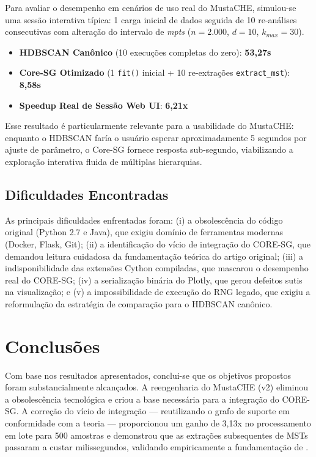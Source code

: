 \documentclass[12pt,a4paper,oneside]{article}
\newcommand{\textcite}{\citet}
\begin{document}
Para avaliar o desempenho em cenários de uso real do MustaCHE, simulou-se uma sessão
interativa típica: 1 carga inicial de dados seguida de 10 re-análises consecutivas com
alteração do intervalo de \textit{mpts} ($n=2.000$, $d=10$, $k_{max}=30$).

\begin{itemize}
  \item \textbf{HDBSCAN Canônico} (10 execuções completas do zero): \textbf{53,27s}
  \item \textbf{Core-SG Otimizado} (1 \texttt{fit()} inicial + 10 re-extrações
        \texttt{extract\_mst}): \textbf{8,58s}
  \item \textbf{Speedup Real de Sessão Web UI}: \textbf{6,21x}
\end{itemize}

Esse resultado é particularmente relevante para a usabilidade do MustaCHE: enquanto o HDBSCAN
faría o usuário esperar aproximadamente 5 segundos por ajuste de parâmetro, o Core-SG fornece
resposta sub-segundo, viabilizando a exploração interativa fluida de múltiplas hierarquias.

\subsection{Dificuldades Encontradas}

As principais dificuldades enfrentadas foram: (i) a obsolescência do código original (Python
2.7 e Java), que exigiu domínio de ferramentas modernas (Docker, Flask, Git); (ii) a
identificação do vício de integração do CORE-SG, que demandou leitura cuidadosa da
fundamentação teórica do artigo original; (iii) a indisponibilidade das extensões Cython
compiladas, que mascarou o desempenho real do CORE-SG; (iv) a serialização binária do Plotly,
que gerou defeitos sutis na visualização; e (v) a impossibilidade de execução do RNG legado,
que exigiu a reformulação da estratégia de comparação para o HDBSCAN canônico.

\section{Conclusões}

Com base nos resultados apresentados, conclui-se que os objetivos propostos foram
substancialmente alcançados. A reengenharia do MustaCHE (v2) eliminou a obsolescência
tecnológica e criou a base necessária para a integração do CORE-SG. A correção do vício de
integração --- reutilizando o grafo de suporte em conformidade com a teoria --- proporcionou um
ganho de 3,13x no processamento em lote para 500 amostras e demonstrou que as extrações
subsequentes de MSTs passaram a custar milissegundos, validando empiricamente a fundamentação
de \textcite{naldi2022coresg}.
\end{document}
